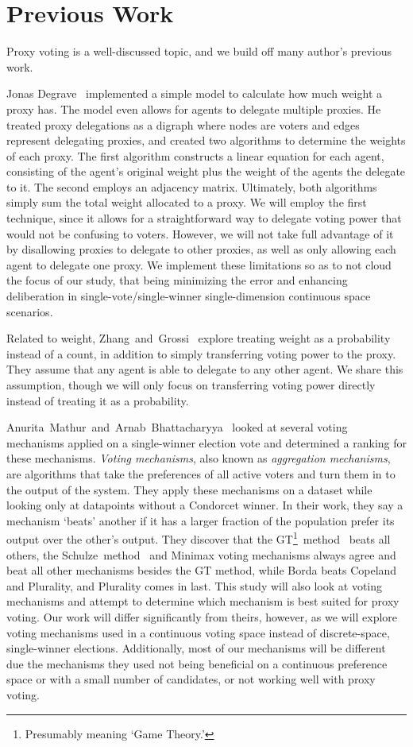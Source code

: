 \section{Previous Work}\label{sec:previous-work}
Proxy voting is a well-discussed topic, and we build off many author's previous work.

Jonas Degrave~\cite{Degrave2014} implemented a simple model to calculate how much
weight a proxy has.
The model even allows for agents to delegate multiple proxies.
He treated proxy delegations as a digraph where nodes are voters and edges represent
delegating proxies, and created two algorithms to determine the weights of each proxy.
The first algorithm constructs a linear equation for each agent, consisting of the
agent's original weight plus the weight of the agents the delegate to it.
The second employs an adjacency matrix.
Ultimately, both algorithms simply sum the total weight allocated to a proxy.
We will employ the first technique, since it allows for a straightforward way to
delegate voting power that would not be confusing to voters.
However, we will not take full advantage of it by disallowing proxies to delegate to
other proxies, as well as only allowing each agent to delegate one proxy.
We implement these limitations so as to not cloud the focus of our study, that being
minimizing the error and enhancing deliberation in single-vote/single-winner
single-dimension
continuous space scenarios.

Related to weight, Zhang~and~Grossi~\cite{Zhang2022} explore treating weight as a
probability instead of a count, in addition to simply transferring voting power to
the proxy.
They assume that any agent is able to delegate to any other agent.
We share this assumption, though we will only focus on transferring voting power
directly instead of treating it as a probability.

Anurita~Mathur~and~Arnab~Bhattacharyya~\cite{Mathur2017} looked at several voting
mechanisms applied on a single-winner election vote and determined a ranking for
these mechanisms.
\textit{Voting mechanisms}, also known as \textit{aggregation mechanisms}, are
algorithms that take the preferences of all active voters and turn them in to the
output of the system.
They apply these mechanisms on a dataset while looking only at datapoints without a
Condorcet winner.
In their work, they say a mechanism `beats' another if it has a larger fraction of
the population prefer its output over the other's output.
They discover that the GT\footnote{
    Presumably meaning `Game Theory.'
}~method~\cite{Rivest2010} beats all others, the Schulze~method~\cite{Schulze2011}
and Minimax voting mechanisms always agree and beat all other mechanisms besides the
GT method, while Borda beats Copeland and Plurality, and Plurality comes in last.
This study will also look at voting mechanisms and attempt to determine which
mechanism is best suited for proxy voting.
Our work will differ significantly from theirs, however, as we will explore voting
mechanisms used in a continuous voting space instead of discrete-space, single-winner
elections.
Additionally, most of our mechanisms will be different due the mechanisms they used
not being beneficial on a continuous preference space or with a small number of
candidates, or not working well with proxy voting.

